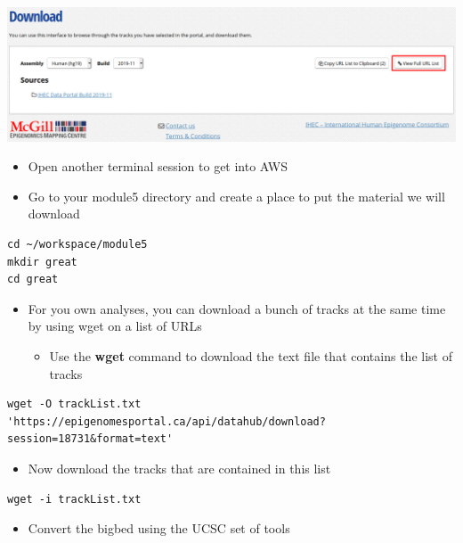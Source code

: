 \documentclass[
]{book}
\providecommand{\tightlist}{%
  \setlength{\itemsep}{0pt}\setlength{\parskip}{0pt}}
\begin{document}
\includegraphics{./img/GREAT_batch_download.png}

\begin{itemize}
\item
  Open another terminal session to get into AWS
\item
  Go to your module5 directory and create a place to put the material we will download
\end{itemize}

\begin{verbatim}
cd ~/workspace/module5
mkdir great
cd great
\end{verbatim}

\begin{itemize}
\tightlist
\item
  For you own analyses, you can download a bunch of tracks at the same time by using wget on a list of URLs

  \begin{itemize}
  \tightlist
  \item
    Use the \textbf{wget} command to download the text file that contains the list of tracks
  \end{itemize}
\end{itemize}

\begin{verbatim}
wget -O trackList.txt 'https://epigenomesportal.ca/api/datahub/download?session=18731&format=text'
\end{verbatim}

\begin{itemize}
\tightlist
\item
  Now download the tracks that are contained in this list
\end{itemize}

\begin{verbatim}
wget -i trackList.txt
\end{verbatim}

\begin{itemize}
\tightlist
\item
  Convert the bigbed using the UCSC set of tools
\end{itemize}
\end{document}
